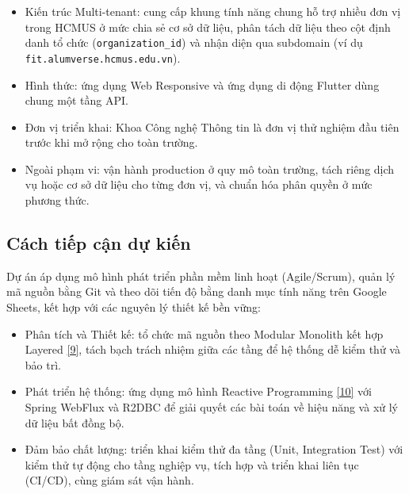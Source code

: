 \documentclass[12pt,a4paper]{article}
\begin{document}
\begin{itemize}
    \item Kiến trúc Multi-tenant: cung cấp khung tính năng chung hỗ trợ nhiều đơn vị trong HCMUS ở mức chia sẻ cơ sở dữ liệu, phân tách dữ liệu theo cột định danh tổ chức (\texttt{organization\_id}) và nhận diện qua subdomain (ví dụ \texttt{fit.alumverse.hcmus.edu.vn}).
    \item Hình thức: ứng dụng Web Responsive và ứng dụng di động Flutter dùng chung một tầng API.
    \item Đơn vị triển khai: Khoa Công nghệ Thông tin là đơn vị thử nghiệm đầu tiên trước khi mở rộng cho toàn trường.
    \item Ngoài phạm vi: vận hành production ở quy mô toàn trường, tách riêng dịch vụ hoặc cơ sở dữ liệu cho từng đơn vị, và chuẩn hóa phân quyền ở mức phương thức.
\end{itemize}

\subsection{Cách tiếp cận dự kiến}
\vspace{-4pt}
Dự án áp dụng mô hình phát triển phần mềm linh hoạt (Agile/Scrum), quản lý mã nguồn bằng Git và theo dõi tiến độ bằng danh mục tính năng trên Google Sheets, kết hợp với các nguyên lý thiết kế bền vững:
\vspace{-4pt}
\begin{itemize}
    \item Phân tích và Thiết kế: tổ chức mã nguồn theo Modular Monolith kết hợp Layered \hyperref[ref:poeaa]{[9]}, tách bạch trách nhiệm giữa các tầng để hệ thống dễ kiểm thử và bảo trì.
    \item Phát triển hệ thống: ứng dụng mô hình Reactive Programming \hyperref[ref:reactive]{[10]} với Spring WebFlux và R2DBC để giải quyết các bài toán về hiệu năng và xử lý dữ liệu bất đồng bộ.
    \item Đảm bảo chất lượng: triển khai kiểm thử đa tầng (Unit, Integration Test) với kiểm thử tự động cho tầng nghiệp vụ, tích hợp và triển khai liên tục (CI/CD), cùng giám sát vận hành.
\end{itemize}

\end{document}
